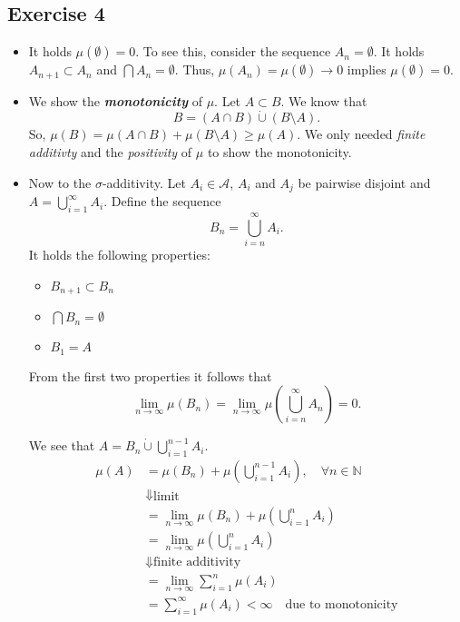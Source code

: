 \documentclass[a4paper]{article}
\newcommand{\vip}[1]{\textit{\textbf{#1}}}
\begin{document}
\subsection*{Exercise 4}

\begin{itemize}
\item It holds $\mu(\emptyset) = 0$. To see this, consider the sequence $A_n = \emptyset$. It holds $A_{n+1} \subset A_n$ and $\bigcap A_n = \emptyset$. Thus, $\mu(A_n) = \mu(\emptyset) \to 0$ implies $\mu(\emptyset) = 0$.

\item We show the \vip{monotonicity} of $\mu$. Let $A \subset B$. We know that
\[
	B = (A \cap B) \dot \cup (B \setminus A).
\]
So, $\mu(B) = \mu(A \cap B) + \mu (B \setminus A) \geq \mu(A)$. We only needed \emph{finite additivty} and the \emph{positivity} of $\mu$ to show the monotonicity.

\item Now to the $\sigma$-additivity. Let $A_i \in \mathcal A$, $A_i$ and $A_j$ be pairwise disjoint and $A = \bigcup^\infty_{i=1} A_i$. Define the sequence
\[
	B_n = \bigcup^\infty_{i=n}A_i.
\]	
It holds the following properties:
\begin{itemize}
\item $B_{n+1} \subset B_{n}$
\item $\bigcap B_n = \emptyset$
\item $B_1 = A$
\end{itemize}

From the first two properties it follows that $$\lim_{n \to \infty}\mu(B_n) = \lim_{n \to \infty} \mu(\bigcup_{i=n}^\infty A_n) = 0.$$

We see that $A = B_n \dot \cup \bigcup^{n-1}_{i=1}A_i$.
\begin{align*}
	\mu(A) &= \mu(B_n) + \mu (\bigcup^{n-1}_{i=1}A_i), \quad \forall n \in \mathbb N\\
	&\Downarrow \text{limit} \\
	&= \lim_{n \to \infty} \mu(B_n) +  \mu (\bigcup^{n}_{i=1}A_i) \\
	&= \lim_{n \to \infty} \mu (\bigcup^{n}_{i=1}A_i) \\
	&\Downarrow \text{finite additivity} \\
	&= \lim_{n \to \infty} \sum^n_{i=1}\mu(A_i)\\
	&= \sum^\infty_{i=1}\mu(A_i) < \infty \quad \text{due to monotonicity}
\end{align*}

\end{itemize}
\end{document}
